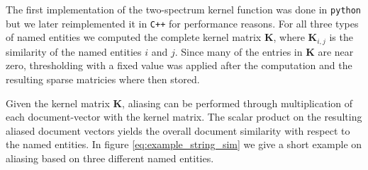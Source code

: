 The first implementation of the two-spectrum kernel function was done in \texttt{python} but we  later reimplemented it in \texttt{C++} for performance reasons. For all three types of named entities we computed the complete kernel matrix $\textbf{K}$, where $\textbf{K}_{i,j}$ is the similarity of the named entities $i$ and $j$. Since many of the entries in $\textbf{K}$ are near zero, thresholding with a fixed value was applied after the computation and the resulting sparse matricies where then stored.

Given the kernel matrix $\textbf{K}$, aliasing can be performed through multiplication of each document-vector with the kernel matrix. The scalar product on the resulting aliased document vectors yields the overall document similarity with respect to the named entities. In figure \ref{eq:example_string_sim} we give a short example on aliasing based on three different named entities.